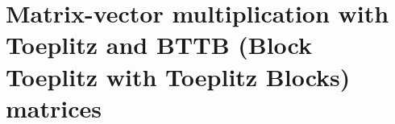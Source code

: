 \documentclass[
pra%
,preprint%
,amssymb, nobibnotes, aps, superscriptaddress, floatfix]{revtex4}
\renewcommand{\imath}{\mathrm{i}}
\newcommand{\dd}{\mathrm{d}}
\newcommand{\rv}{\mathbf{r}}
\begin{document}
%
%

%
%
%
%
%
\pagebreak

\section{Matrix-vector multiplication with Toeplitz and BTTB (Block Toeplitz with Toeplitz Blocks) matrices}
\end{document}
